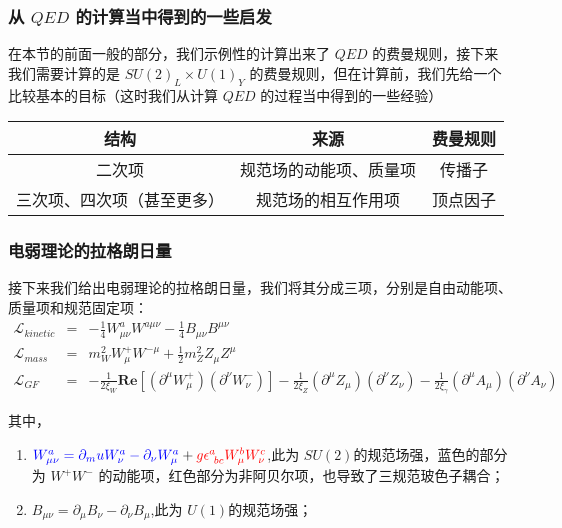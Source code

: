 \documentclass{article}
\begin{document}
\subsubsection{从 $QED$ 的计算当中得到的一些启发}
在本节的前面一般的部分，我们示例性的计算出来了 $QED$ 的费曼规则，接下来我们需要计算的是 $SU(2)_{L} \times U(1)_{Y}$ 的费曼规则，但在计算前，我们先给一个比较基本的目标（这时我们从计算 $QED$ 的过程当中得到的一些经验）
\begin{table}[hbpt]
    \centering
    \begin{tabular}{ccc}
        \hline
        结构 & 来源 & 费曼规则 \\
        \hline
        二次项 & 规范场的动能项、质量项 & 传播子 \\
        \hline
        三次项、四次项（甚至更多） & 规范场的相互作用项 & 顶点因子 \\
        \hline
    \end{tabular}
\end{table}

\subsubsection{电弱理论的拉格朗日量}
接下来我们给出电弱理论的拉格朗日量，我们将其分成三项，分别是自由动能项、质量项和规范固定项\cite{commins1985weak}：
\begin{eqnarray}
    \mathcal{L}_{kinetic} &=& -\frac{1}{4}W_{\mu\nu}^{a}W^{a\mu\nu} - \frac{1}{4}B_{\mu\nu}B^{\mu\nu} \\
    \mathcal{L}_{mass} &=& m_W^2 W_{\mu}^+ W^{-\mu} + \frac{1}{2}m_Z^2 Z_{\mu}Z^{\mu} \\
    \mathcal{L}_{GF} &=& - \frac{1}{2\xi_W} \mathbf{Re}\left[\left(\partial^\mu W_\mu^{+}\right)\left(\partial^\nu W_{\nu}^{-}\right)\right] - \frac{1}{2\xi_Z} \left(\partial^\mu Z_\mu\right)\left(\partial^\nu Z_{\nu}\right) - \frac{1}{2\xi_{\gamma}} \left(\partial^\mu A_\mu\right)\left(\partial^\nu A_{\nu}\right)
\end{eqnarray}

其中，
\begin{enumerate}
    \item $\textcolor{blue}{W_{\mu\nu}^{a} = \partial_mu W_{\nu}^a - \partial_\nu W_{\mu}^a} + \textcolor{red}{g \epsilon_{\ bc}^{a}W_\mu^b W_\nu^c}$,此为 $SU(2)$的规范场强，蓝色的部分为 $W^+ W^-$ 的动能项，红色部分为非阿贝尔项，也导致了三规范玻色子耦合；
    \item $B_{\mu\nu} = \partial_\mu B_\nu - \partial_\nu B_\mu$,此为 $U(1)$的规范场强； 
\end{enumerate}
\end{document}
